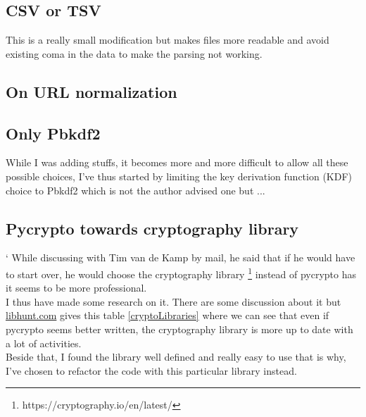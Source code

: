 \documentclass{eplmastersthesis}
\begin{document}
\subsection{CSV or TSV}
This is a really small modification but makes files more readable and avoid existing coma in the data to make the parsing not working.

\subsection{On URL normalization}

\subsection{Only Pbkdf2}
While I was adding stuffs, it becomes more and more difficult to allow all these possible choices, I've thus started by limiting the key derivation function (KDF) choice to Pbkdf2 which is not the author advised one but ...

\subsection{Pycrypto towards cryptography library}`
While discussing with Tim van de Kamp by mail, he said that if he would have to start over, he would choose the cryptography library \footnote{https://cryptography.io/en/latest/} instead of pycrypto has it seems to be more professional.\\
I thus have made some research on it. There are some discussion about it but \url{libhunt.com} gives this table \ref{cryptoLibraries} where we can see that even if pycrypto seems better written, the cryptography library is more up to date with a lot of activities.\\
Beside that, I found the library well defined and really easy to use that is why, I've chosen to refactor the code with this particular library instead.
\end{document}
